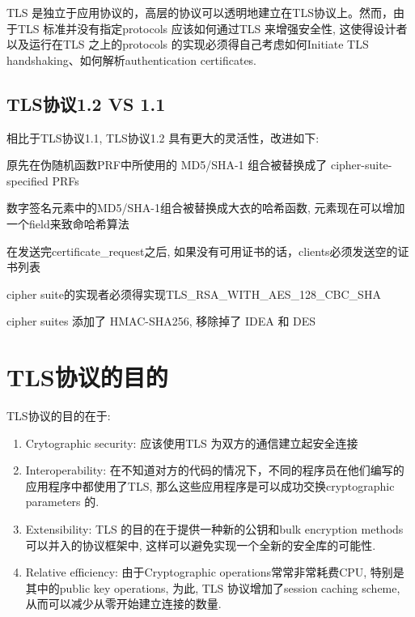 \documentclass[a4paper]{ctexart}
\begin{document}
TLS 是独立于应用协议的，高层的协议可以透明地建立在TLS协议上。然而，由于TLS 标准并没有指定protocols 应该如何通过TLS 来增强安全性,
这使得设计者以及运行在TLS 之上的protocols 的实现必须得自己考虑如何Initiate TLS handshaking、如何解析authentication certificates.

\subsection{TLS协议1.2 VS 1.1}
相比于TLS协议1.1, TLS协议1.2 具有更大的灵活性，改进如下:
\begin{description}
    \kaishu 
  \item[-] 原先在伪随机函数PRF中所使用的 MD5/SHA-1 组合被替换成了 cipher-suite-specified PRFs
  \item[-] 数字签名元素中的MD5/SHA-1组合被替换成大衣的哈希函数, 元素现在可以增加一个field来致命哈希算法
  \item[-] 在发送完certificate\_request之后, 如果没有可用证书的话，clients必须发送空的证书列表
  \item[-] cipher suite的实现者必须得实现TLS\_RSA\_WITH\_AES\_128\_CBC\_SHA
  \item[-] cipher suites 添加了 HMAC-SHA256, 移除掉了 IDEA 和 DES
\end{description}


\section{TLS协议的目的} \label{sec:goal}
TLS协议的目的在于:
\begin{enumerate}
    \kaishu 
  \item Crytographic security: 应该使用TLS 为双方的通信建立起安全连接
  \item Interoperability: 在不知道对方的代码的情况下，不同的程序员在他们编写的应用程序中都使用了TLS, 
    那么这些应用程序是可以成功交换cryptographic parameters 的.
  \item Extensibility: TLS 的目的在于提供一种新的公钥和bulk encryption methods 可以并入的协议框架中, 
    这样可以避免实现一个全新的安全库的可能性.
  \item Relative efficiency: 由于Cryptographic operations常常非常耗费CPU, 特别是其中的public key operations, 为此,
    TLS 协议增加了session caching scheme, 从而可以减少从零开始建立连接的数量.

\end{enumerate}
\end{document}
